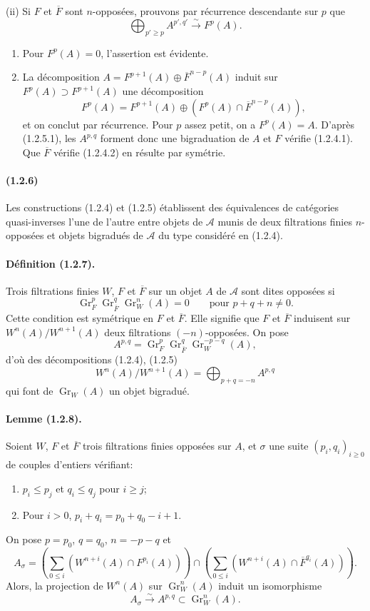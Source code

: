 \documentclass[10pt]{article}
\newcommand{\Gr}{\operatorname{Gr}}
\newcommand{\calA}{\mathcal A}
\newcommand{\iso}{\xrightarrow{\sim}}
\begin{document}
(ii) Si $F$ et $\overline F$ sont $n$-opposées, prouvons par récurrence descendante sur $p$ que
\[
\tag{1.2.5.1}
\bigoplus_{p'\ge p} A^{p',q'}\iso F^p(A).
\]
\begin{enumerate}[label=\alph*)]
\item Pour $F^p(A)=0$, l'assertion est évidente.
\item La décomposition $A=F^{p+1}(A)\oplus\overline F^{n-p}(A)$ induit sur $F^p(A)\supset F^{p+1}(A)$ une décomposition
\[
F^p(A)=F^{p+1}(A)\oplus(F^p(A)\cap\overline F^{n-p}(A)),
\]
et on conclut par récurrence. Pour $p$ assez petit, on a $F^p(A)=A$. D'après (1.2.5.1), les $A^{p,q}$ forment donc une bigraduation de $A$ et $F$ vérifie (1.2.4.1). Que $\overline F$ vérifie (1.2.4.2) en résulte par symétrie.
\end{enumerate}

\paragraph{(1.2.6)} Les constructions (1.2.4) et (1.2.5) établissent des équivalences de catégories quasi-inverses l'une de l'autre entre objets de $\calA$ munis de deux filtrations finies $n$-opposées et objets bigradués de $\calA$ du type considéré en (1.2.4).

\paragraph{Définition (1.2.7).} Trois filtrations finies $W$, $F$ et $\overline F$ sur un objet $A$ de $\calA$ sont dites opposées si
\[
\Gr_F^p\Gr_{\overline F}^{q}\Gr_W^n(A)=0\qquad\text{pour }p+q+n\ne0.
\]
Cette condition est symétrique en $F$ et $\overline F$. Elle signifie que $F$ et $\overline F$ induisent sur $W^n(A)/W^{n+1}(A)$ deux filtrations $(-n)$-opposées. On pose
\[
A^{p,q}=\Gr_F^p\Gr_{\overline F}^{q}\Gr_W^{-p-q}(A),
\]
d'où des décompositions (1.2.4), (1.2.5)
\[
\tag{1.2.7.1}
W^n(A)/W^{n+1}(A)=\bigoplus_{p+q=-n}A^{p,q}
\]
qui font de $\Gr_W(A)$ un objet bigradué.

\paragraph{Lemme (1.2.8).} Soient $W$, $F$ et $\overline F$ trois filtrations finies opposées sur $A$, et $\sigma$ une suite $(p_i,q_i)_{i\ge0}$ de couples d'entiers vérifiant:
\begin{enumerate}[label=\alph*)]
\item $p_i\le p_j$ et $q_i\le q_j$ pour $i\ge j$;
\item Pour $i>0$, $p_i+q_i=p_0+q_0-i+1$.
\end{enumerate}
On pose $p=p_0$, $q=q_0$, $n=-p-q$ et
\[
A_\sigma=\left(\sum_{0\le i} (W^{n+i}(A)\cap F^{p_i}(A))\right)
\cap
\left(\sum_{0\le i} (W^{n+i}(A)\cap \overline F^{q_i}(A))\right).
\]
Alors, la projection de $W^n(A)$ sur $\Gr_W^n(A)$ induit un isomorphisme
\[
A_\sigma\iso A^{p,q}\subset\Gr_W^n(A).
\]
\end{document}
